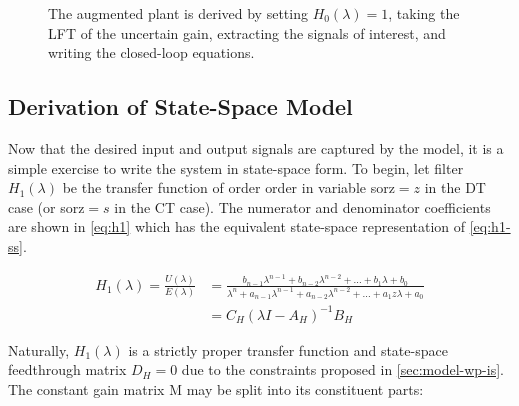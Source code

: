 \begin{figure}
	\caption{The augmented plant is derived by setting $H_0(\lambda) = 1$, taking the LFT of the uncertain gain, extracting the signals of interest, and writing the closed-loop equations.} \label{fig:sdm-aug}
\end{figure}

\subsection{Derivation of State-Space Model}

Now that the desired input and output signals are captured by the model, it is a simple exercise to write the system in state-space form. To begin, let filter $H_1(\lambda)$ be the transfer function of order \gls{order} in variable \gls{sorz}$ = z$ in the \gls{DT} case (or \gls{sorz}$ = s$ in the \gls{CT} case). The numerator and denominator coefficients are shown in \autoref{eq:h1} which has the equivalent state-space representation of \autoref{eq:h1-ss}.

\begin{align}
	H_1(\lambda) = \frac{U(\lambda)}{E(\lambda)} &= \frac{b_{n-1}\lambda^{n-1} + b_{n-2}\lambda^{n-2} + \ldots + b_1\lambda + b_0}{\lambda^n + a_{n-1}\lambda^{n-1} + a_{n-2}\lambda^{n-2} + \ldots + a_1z\lambda + a_0} \label{eq:h1} \\
	&= C_H(\lambda I - A_H)^{-1}B_H \label{eq:h1-ss}
\end{align}

Naturally, $H_1(\lambda)$ is a strictly proper transfer function and state-space feedthrough matrix $D_H = 0$ due to the constraints proposed in \autoref{sec:model-wp-is}. The constant gain matrix \gls{M} may be split into its constituent parts:


